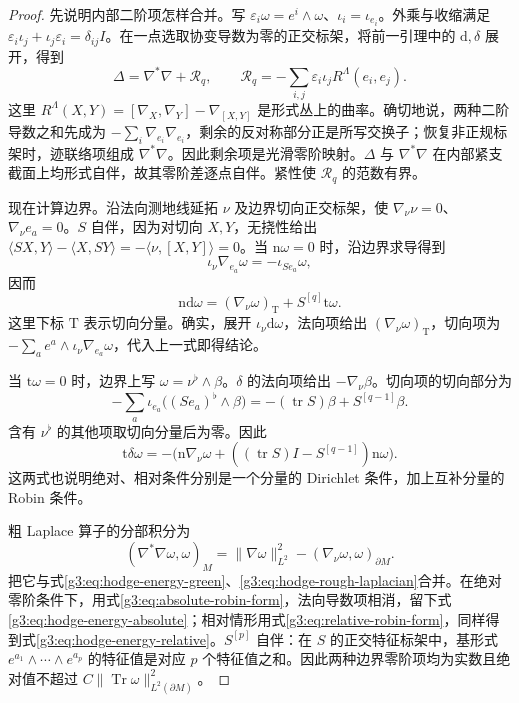 \begin{proof}
	先说明内部二阶项怎样合并。写 \(\varepsilon_i\omega=e^i\wedge\omega\)、\(\iota_i=\iota_{e_i}\)。外乘与收缩满足
	\(\varepsilon_i\iota_j+\iota_j\varepsilon_i=\delta_{ij}I\)。在一点选取协变导数为零的正交标架，将前一引理中的 \(\mathrm d,\delta\) 展开，得到
	\begin{equation}\label{g3:eq:hodge-rough-laplacian}
		\Delta=\nabla^*\nabla+\mathcal R_q,
		\qquad
		\mathcal R_q=-\sum_{i,j}\varepsilon_i\iota_j R^\Lambda(e_i,e_j).
	\end{equation}
	这里 \(R^\Lambda(X,Y)=[\nabla_X,\nabla_Y]-\nabla_{[X,Y]}\) 是形式丛上的曲率。确切地说，两种二阶导数之和先成为 \(-\sum_i\nabla_{e_i}\nabla_{e_i}\)，剩余的反对称部分正是所写交换子；恢复非正规标架时，迹联络项组成 \(\nabla^*\nabla\)。因此剩余项是光滑零阶映射。\(\Delta\) 与 \(\nabla^*\nabla\) 在内部紧支截面上均形式自伴，故其零阶差逐点自伴。紧性使 \(\mathcal R_q\) 的范数有界。

	现在计算边界。沿法向测地线延拓 \(\nu\) 及边界切向正交标架，使 \(\nabla_\nu\nu=0\)、\(\nabla_\nu e_a=0\)。\(S\) 自伴，因为对切向 \(X,Y\)，无挠性给出
	\(\langle SX,Y\rangle-\langle X,SY\rangle=-\langle\nu,[X,Y]\rangle=0\)。当 \(\mathrm n\omega=0\) 时，沿边界求导得到
	\[
		\iota_\nu\nabla_{e_a}\omega=-\iota_{S e_a}\omega,
	\]
	因而
	\begin{equation}\label{g3:eq:absolute-robin-form}
		\mathrm n\mathrm d\omega
		=(\nabla_\nu\omega)_{\mathrm T}+S^{[q]}\mathrm t\omega.
	\end{equation}
	这里下标 \(\mathrm T\) 表示切向分量。确实，展开 \(\iota_\nu\mathrm d\omega\)，法向项给出 \((\nabla_\nu\omega)_{\mathrm T}\)，切向项为
	\(-\sum_a e^a\wedge\iota_\nu\nabla_{e_a}\omega\)，代入上一式即得结论。

	当 \(\mathrm t\omega=0\) 时，边界上写 \(\omega=\nu^\flat\wedge\beta\)。\(\delta\) 的法向项给出 \(-\nabla_\nu\beta\)。切向项的切向部分为
	\[
		-\sum_a\iota_{e_a}\bigl((S e_a)^\flat\wedge\beta\bigr)
		=-(\operatorname{tr}S)\beta+S^{[q-1]}\beta.
	\]
	含有 \(\nu^\flat\) 的其他项取切向分量后为零。因此
	\begin{equation}\label{g3:eq:relative-robin-form}
		\mathrm t\delta\omega
		=-\bigl(\mathrm n\nabla_\nu\omega
		+((\operatorname{tr}S)I-S^{[q-1]})\mathrm n\omega\bigr).
	\end{equation}
	这两式也说明绝对、相对条件分别是一个分量的 Dirichlet 条件，加上互补分量的 Robin 条件。

	粗 Laplace 算子的分部积分为
	\[
		(\nabla^*\nabla\omega,\omega)_M
		=\|\nabla\omega\|_{L^2}^2-(\nabla_\nu\omega,\omega)_{\partial M}.
	\]
	把它与式\eqref{g3:eq:hodge-energy-green}、\eqref{g3:eq:hodge-rough-laplacian}合并。在绝对零阶条件下，用式\eqref{g3:eq:absolute-robin-form}，法向导数项相消，留下式\eqref{g3:eq:hodge-energy-absolute}；相对情形用式\eqref{g3:eq:relative-robin-form}，同样得到式\eqref{g3:eq:hodge-energy-relative}。\(S^{[p]}\) 自伴：在 \(S\) 的正交特征标架中，基形式 \(e^{a_1}\wedge\cdots\wedge e^{a_p}\) 的特征值是对应 \(p\) 个特征值之和。因此两种边界零阶项均为实数且绝对值不超过 \(C\|\operatorname{Tr}\omega\|_{L^2(\partial M)}^2\)。


\end{proof}
